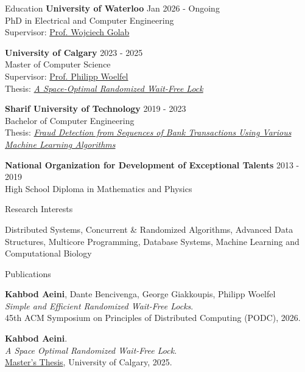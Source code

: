 \documentclass{resume} %
\begin{document}

\begin{rSection}{Education}
{\bf University of Waterloo} \hfill {Jan 2026 - Ongoing} 
\\ PhD in Electrical and Computer Engineering
\\ Supervisor: \href{https://uwaterloo.ca/distributed-algorithms-systems-lab/}{Prof. Wojciech Golab}

{\bf University of Calgary} \hfill { 2023 - 2025} 
\\ Master of Computer Science
\\ Supervisor: \href{https://www.woelfellab.org/about.html}{Prof. Philipp Woelfel}
\\ Thesis: \textit{\href{https://ucalgary.scholaris.ca/bitstreams/5ae5cf8f-5009-4db3-b91e-d3dbb679b5bf/download}{A Space-Optimal Randomized Wait-Free Lock}}


{\bf Sharif University of Technology} \hfill { 2019 - 2023} 
\\ Bachelor of Computer Engineering
\\ Thesis: \href{https://github.com/kahbodaeini/Fraud-Detection}{\textit{Fraud Detection from Sequences of Bank Transactions Using Various Machine Learning Algorithms}}


{\bf National Organization for Development of Exceptional Talents } \hfill { 2013 - 2019} 
\\ High School Diploma in Mathematics and
Physics
\end{rSection}


\begin{rSection}{Research Interests}

Distributed Systems, Concurrent \& Randomized Algorithms, Advanced Data Structures,
Multicore Programming, Database Systems, Machine Learning and Computational Biology
\end{rSection}


\begin{rSection}{Publications}

{\bf Kahbod Aeini}, Dante Bencivenga, George Giakkoupis, Philipp Woelfel \\
\textit{Simple and Efficient Randomized Wait-Free Locks}. \\
45th ACM Symposium on Principles of Distributed Computing (PODC), 2026.

{\bf Kahbod Aeini}. \\
\textit{A Space Optimal Randomized Wait-Free Lock}. \\
\href{https://ucalgary.scholaris.ca/bitstreams/5ae5cf8f-5009-4db3-b91e-d3dbb679b5bf/download}{Master's Thesis}, University of Calgary, 2025.
\end{rSection}
\end{document}

